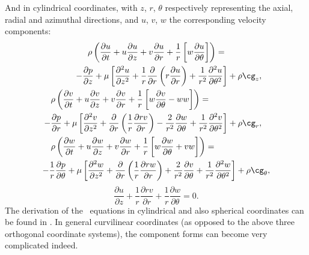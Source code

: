 \documentclass[twoside,11pt]		{report}
\begin{document}
And in cylindrical coordinates, with $z$, $r$, $\theta$ respectively
representing the axial, radial and azimuthal directions, and $u$, $v$,
$w$ the corresponding velocity components:
\begin{multline*}
\rho\left(
 \frac{\partial u}{\partial t} +
u\frac{\partial u}{\partial z} +
v\frac{\partial u}{\partial r} +
\frac{1}{r}\left[w\frac{\partial u}{\partial\theta}\right]\right) =\\
\shoveright{-\frac{\partial p}{\partial z}+
\mu\left[
\frac{\partial^2 u}{\partial z^2} +
\frac{1}{r}\frac{\partial}{\partial r}\left(r\frac{\partial u}{\partial r}\right) +
\frac{1}{r^2}\frac{\partial^2 u}{\partial\theta^2}
\right] +\rho\cg_z,}\\
\shoveleft{\rho\left(
 \frac{\partial v}{\partial t} +
u\frac{\partial v}{\partial z} +
v\frac{\partial v}{\partial r} +
\frac{1}{r}\left[w\frac{\partial v}{\partial\theta} - ww\right]\right) =}\\
\shoveright{-\frac{\partial p}{\partial r}+
\mu\left[
\frac{\partial^2 v}{\partial z^2} +
\frac{\partial}{\partial r}\left(\frac{1}{r}\frac{\partial
 rv}{\partial r}\right) -
\frac{2}{r^2}\frac{\partial w}{\partial\theta} +
\frac{1}{r^2}\frac{\partial^2 v}{\partial\theta^2}
\right] + \rho\cg_r,}\\
\shoveleft{\rho\left(
 \frac{\partial w}{\partial t} +
u\frac{\partial w}{\partial z} +
v\frac{\partial w}{\partial r} +
\frac{1}{r}\left[w\frac{\partial w}{\partial\theta} + vw\right]\right) =}\\
-\frac{1}{r}\frac{\partial p}{\partial\theta}+
\mu\left[
\frac{\partial^2 w}{\partial z^2} +
\frac{\partial}{\partial r}\left(\frac{1}{r}\frac{\partial
 rw}{\partial r}\right) + \frac{2}{r^2}\frac{\partial v}{\partial\theta} +
\frac{1}{r^2}\frac{\partial^2 w}{\partial\theta^2}
\right] + \rho\cg_\theta,
\end{multline*}
\[
\frac{\partial u}{\partial z} +
\frac{1}{r}\frac{\partial rv}{\partial r} +
\frac{1}{r}\frac{\partial w}{\partial \theta} = 0.
\]
The derivation of the \NavSto\ equations in cylindrical and also
spherical coordinates can be found in \citet{bsl62}. In general
curvilinear coordinates (as opposed to the above three orthogonal
coordinate systems), the component forms can become very complicated
indeed.

\end{document}
